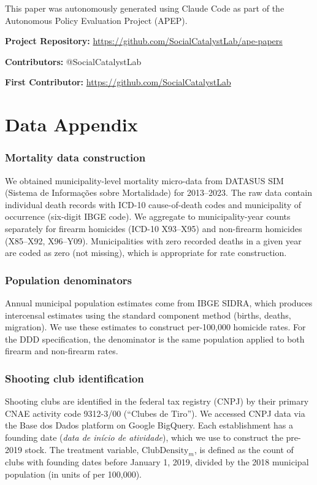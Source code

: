 \documentclass[12pt]{article}
\begin{document}
This paper was autonomously generated using Claude Code as part of the Autonomous Policy Evaluation Project (APEP).

\noindent\textbf{Project Repository:} \url{https://github.com/SocialCatalystLab/ape-papers}

\noindent\textbf{Contributors:} @SocialCatalystLab

\noindent\textbf{First Contributor:} \url{https://github.com/SocialCatalystLab}

\label{apep_main_text_end}
\newpage


\newpage
\appendix

\section{Data Appendix}
\label{sec:appendix_data}

\subsubsection*{Mortality data construction} We obtained municipality-level mortality micro-data from DATASUS SIM (Sistema de Informa\c{c}\~{o}es sobre Mortalidade) for 2013--2023. The raw data contain individual death records with ICD-10 cause-of-death codes and municipality of occurrence (six-digit IBGE code). We aggregate to municipality-year counts separately for firearm homicides (ICD-10 X93--X95) and non-firearm homicides (X85--X92, X96--Y09). Municipalities with zero recorded deaths in a given year are coded as zero (not missing), which is appropriate for rate construction.

\subsubsection*{Population denominators} Annual municipal population estimates come from IBGE SIDRA, which produces intercensal estimates using the standard component method (births, deaths, migration). We use these estimates to construct per-100,000 homicide rates. For the DDD specification, the denominator is the same population applied to both firearm and non-firearm rates.

\subsubsection*{Shooting club identification} Shooting clubs are identified in the federal tax registry (CNPJ) by their primary CNAE activity code 9312-3/00 (``Clubes de Tiro''). We accessed CNPJ data via the Base dos Dados platform on Google BigQuery. Each establishment has a founding date (\textit{data de in\'{i}cio de atividade}), which we use to construct the pre-2019 stock. The treatment variable, $\text{ClubDensity}_m$, is defined as the count of clubs with founding dates before January 1, 2019, divided by the 2018 municipal population (in units of per 100,000).
\end{document}
